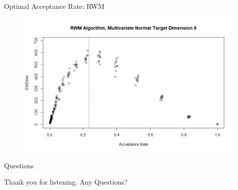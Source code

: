 \documentclass{beamer}
\begin{document}
\begin{frame}{Optimal Acceptance Rate: RWM}
\begin{figure}
\centering
\includegraphics[scale = 0.4]{RWM_Optimal8.png}
\end{figure}
\end{frame}



\begin{frame}{Questions}

\begin{center}
Thank you for listening.
\vskip 0.5cm
Any Questions?

\end{center}

\end{frame}
\end{document}
